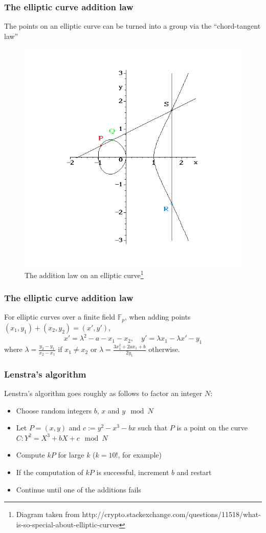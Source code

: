 \documentclass{beamer}
\begin{document}
\begin{frame} %
\frametitle{The elliptic curve addition law}
The points on an elliptic curve can be turned into a group via the ``chord-tangent law''
\begin{figure}[htpb]
	\centering
	\includegraphics[scale=0.25]{addition.png}
	\caption{The addition law on an elliptic curve\footnote{Diagram taken from http://crypto.stackexchange.com/questions/11518/what-is-so-special-about-elliptic-curves}}
\end{figure}
\end{frame}

\begin{frame} %
\frametitle{The elliptic curve addition law}
For elliptic curves over a finite field $\mathbb{F}_p$, when adding points $(x_1,y_1) + (x_2,y_2) = (x',y')$,
$$x'=\lambda^2 - a - x_1 - x_2,\quad y' = \lambda x_1 -\lambda x' - y_1 $$
where $\lambda = \frac{y_2-y_1}{x_2-x_1}$ if $x_1\neq x_2$ or $\lambda=\frac{3x_1^2 + 2ax_1 + b}{2y_1}$ otherwise.
\end{frame}

\begin{frame} %
\frametitle{Lenstra's algorithm}
\begin{definition}
	Lenstra's algorithm goes roughly as follows to factor an integer $N$:
	\begin{itemize}
		\item Choose random integers $b$, $x$ and $y \mod N$
		\item Let $P = (x,y)$ and $c:=y^2-x^3-bx$ such that $P$ is a point on the curve $C: Y^2 = X^3 +bX + c \mod N$
		\item Compute $kP$ for large $k$ ($k=10!$, for example)
		\item If the computation of $kP$ is successful, increment $b$ and restart
		\item Continue until one of the additions fails
	\end{itemize}
\end{definition}
\end{frame}
\end{document}
